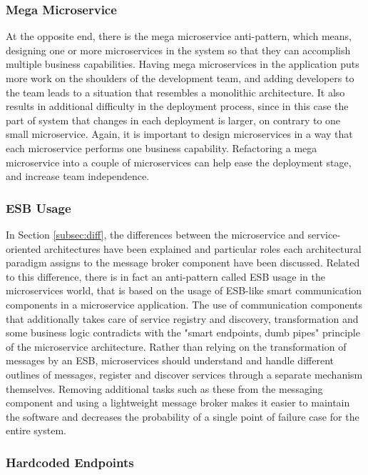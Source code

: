 \documentclass{Configuration_Files/PoliMi3i_thesis}
\begin{document}
\subsubsection{Mega Microservice}
\label{subsubsec:mega_microservice}

At the opposite end, there is the mega microservice anti-pattern, which means, designing one or more microservices in the system so that they can accomplish multiple business capabilities.
Having mega microservices in the application puts more work on the shoulders of the development team, and adding developers to the team leads to a situation that resembles a monolithic architecture.
It also results in additional difficulty in the deployment process, since in this case the part of system that changes in each deployment is larger, on contrary to one small microservice.
Again, it is important to design microservices in a way that each microservice performs one business capability.
Refactoring a mega microservice into a couple of microservices can help ease the deployment stage, and increase team independence.

\subsubsection{ESB Usage}
\label{subsubsec:esb_usage}

In Section \ref{subsec:diff}, the differences between the microservice and service-oriented architectures have been explained and particular roles each architectural paradigm assigns to the message broker component have been discussed.
Related to this difference, there is in fact an anti-pattern called ESB usage in the microservices world, that is based on the usage of ESB-like smart communication components in a microservice application.
The use of communication components that additionally takes care of service registry and discovery, transformation and some business logic contradicts with the "smart endpoints, dumb pipes" principle of the microservice architecture.
Rather than relying on the transformation of messages by an ESB, microservices should understand and handle different outlines of messages, register and discover services through a separate mechanism themselves.
Removing additional tasks such as these from the messaging component and using a lightweight message broker makes it easier to maintain the software and decreases the probability of a single point of failure case for the entire system.

\subsubsection{Hardcoded Endpoints}
\label{subsubsec:hardcoded_endpoints}
\end{document}
